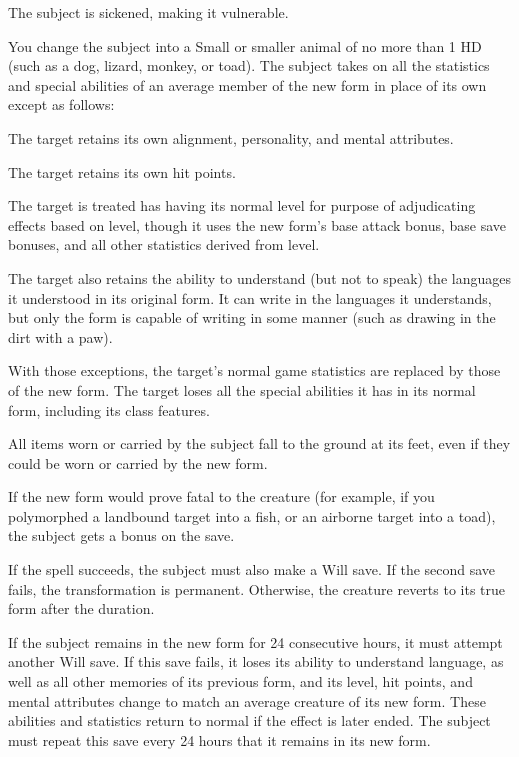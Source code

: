 \begin{spellhealthy}
  The subject is sickened, making it vulnerable.
\end{spellhealthy}
\begin{spellblood}
  You change the subject into a Small or smaller animal of no more than 1 HD (such as a dog, lizard, monkey, or toad). The subject takes on all the statistics and special abilities of an average member of the new form in place of its own except as follows:
  \begin{itemize*} 
    \item The target retains its own alignment, personality, and mental attributes.
    \item The target retains its own hit points. 
    \item The target is treated has having its normal level for purpose of adjudicating effects based on level, though it uses the new form's base attack bonus, base save bonuses, and all other statistics derived from level. 
    \item The target also retains the ability to understand (but not to speak) the languages it understood in its original form. It can write in the languages it understands, but only the form is capable of writing in some manner (such as drawing in the dirt with a paw). 
  \end{itemize*}
  With those exceptions, the target's normal game statistics are replaced by those of the new form. The target loses all the special abilities it has in its normal form, including its class features.

  All items worn or carried by the subject fall to the ground at its feet, even if they could be worn or carried by the new form. 

  If the new form would prove fatal to the creature (for example, if you polymorphed a landbound target into a fish, or an airborne target into a toad), the subject gets a  bonus on the save. 

  If the spell succeeds, the subject must also make a Will save. If the second save fails, the transformation is permanent. Otherwise, the creature reverts to its true form after the \durshort duration.

  If the subject remains in the new form for 24 consecutive hours, it must attempt another Will save. If this save fails, it loses its ability to understand language, as well as all other memories of its previous form, and its level, hit points, and mental attributes change to match an average creature of its new form. These abilities and statistics return to normal if the effect is later ended. The subject must repeat this save every 24 hours that it remains in its new form. 
\end{spellblood}
